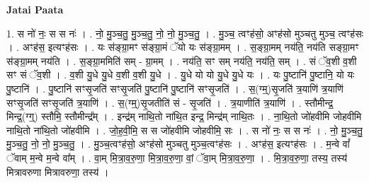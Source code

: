 \documentclass[17pt]{extarticle}
\begin{document}
\textbf{Jatai Paata} \newline

1. स नो॑ नः॒ स स नः॑ । . नो॒ मु॒ञ्च॒तु॒ मु॒ञ्च॒तु॒ नो॒ नो॒ मु॒ञ्च॒तु॒ । . मु॒ञ्च॒ त्वꣳह॑सो॒ अꣳह॑सो मुञ्चतु मुञ्च॒ त्वꣳह॑सः । . अꣳह॑स॒ इत्यꣳह॑सः । . यः स॑ङ्ग्रा॒मꣳ स॑ङ्ग्रा॒मं ॅयो यः स॑ङ्ग्रा॒मम् । . स॒ङ्ग्रा॒मम् नय॑ति॒ नय॑ति सङ्ग्रा॒मꣳ स॑ङ्ग्रा॒मम् नय॑ति । . स॒ङ्ग्रा॒ममिति॑ सम् - ग्रा॒मम् । . नय॑ति॒ सꣳ सम् नय॑ति॒ नय॑ति॒ सम् । . सं ॅव॒शी व॒शी सꣳ सं ॅव॒शी । . व॒शी यु॒धे यु॒धे व॒शी व॒शी यु॒धे । . यु॒धे यो यो यु॒धे यु॒धे यः । . यः पु॒ष्टानि॑ पु॒ष्टानि॒ यो यः पु॒ष्टानि॑ । . पु॒ष्टानि॑ सꣳसृ॒जति॑ सꣳसृ॒जति॑ पु॒ष्टानि॑ पु॒ष्टानि॑ सꣳसृ॒जति॑ । . स॒(ग्म्॒)सृ॒जति॑ त्र॒याणि॑ त्र॒याणि॑ सꣳसृ॒जति॑ सꣳसृ॒जति॑ त्र॒याणि॑ । . स॒(ग्म्॒)सृ॒जतीति॑ सं - सृ॒जति॑ । . त्र॒याणीति॑ त्र॒याणि॑ । . स्तौमीन्द्र॒ मिन्द्र॒(ग्ग्॒) स्तौमि॒ स्तौमीन्द्र᳚म् । . इन्द्र॑म् नाथि॒तो ना॑थि॒त इन्द्र॒ मिन्द्र॑म् नाथि॒तः । . ना॒थि॒तो जो॑हवीमि जोहवीमि नाथि॒तो ना॑थि॒तो जो॑हवीमि । . जो॒ह॒वी॒मि॒ स स जो॑हवीमि जोहवीमि॒ सः । . स नो॑ नः॒ स स नः॑ । . नो॒ मु॒ञ्च॒तु॒ मु॒ञ्च॒तु॒ नो॒ नो॒ मु॒ञ्च॒तु॒ । . मु॒ञ्च॒त्वꣳह॑सो॒ अꣳह॑सो मुञ्चतु मुञ्च॒त्वꣳह॑सः । . अꣳह॑स॒ इत्यꣳह॑सः । . म॒न्वे वां᳚ ॅवाम् म॒न्वे म॒न्वे वा᳚म् । . वा॒म् मि॒त्रा॒व॒रु॒णा॒ मि॒त्रा॒व॒रु॒णा॒ वां॒ ॅवा॒म् मि॒त्रा॒व॒रु॒णा॒ । . मि॒त्रा॒व॒रु॒णा॒ तस्य॒ तस्य॑ मित्रावरुणा मित्रावरुणा॒ तस्य॑ । \newline
\end{document}
